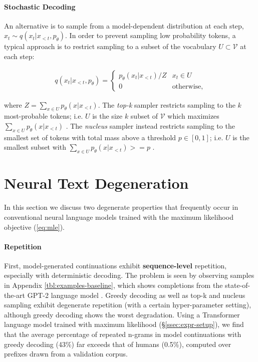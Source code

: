 \paragraph{Stochastic Decoding} 

An alternative is to sample from a model-dependent distribution at each step, $x_t\sim q(x_t|x_{<t},p_{\theta})$.
In order to prevent sampling low probability tokens, a typical approach is to restrict sampling to a subset of the vocabulary $U\subset \mathcal{V}$ at each step:

\begin{align*}
    q(x_t|x_{<t},p_{\theta})=\begin{cases}
        p_{\theta}(x_t|x_{<t})/Z & x_t\in U\\ 0 & \text{otherwise},
    \end{cases}
\end{align*}

where $Z=\sum_{x\in U}p_{\theta}(x|x_{<t})$. The \textit{top-k} sampler restricts sampling to the $k$ most-probable tokens; i.e. $U$ is the size $k$ subset of $\mathcal{V}$ which maximizes $\sum_{x\in U}p_{\theta}(x|x_{<t})$ \citep{fan2018hierarchical}. The \textit{nucleus} sampler instead restricts sampling to the smallest set of tokens with total mass above a threshold $p\in[0,1]$; i.e. $U$ is the smallest subset with $\sum_{x\in U}p_{\theta}(x|x_{<t})>=p$ \citep{holtzman2019curious}.

\section{Neural Text Degeneration}
\label{sec:degen}

In this section we discuss two degenerate properties that frequently occur in conventional neural language models trained with the maximum likelihood objective (\autoref{eq:mle}).

\paragraph{Repetition} 

First, model-generated continuations exhibit \textbf{sequence-level} repetition, especially with deterministic decoding. The problem is seen by observing samples in Appendix \autoref{tbl:examples-baseline}, which shows completions from the state-of-the-art GPT-2 language model \citep{radford2019language}. Greedy decoding as well as top-k and nucleus sampling exhibit degenerate repetition (with a certain hyper-parameter setting), although greedy decoding shows the worst degradation. Using a Transformer language model trained with maximum likelihood (\S\ref{ssec:expr-setup}), we find that the average percentage of repeated n-grams in model continuations with greedy decoding (43\%) far exceeds that of humans (0.5\%), computed over prefixes drawn from a validation corpus.

